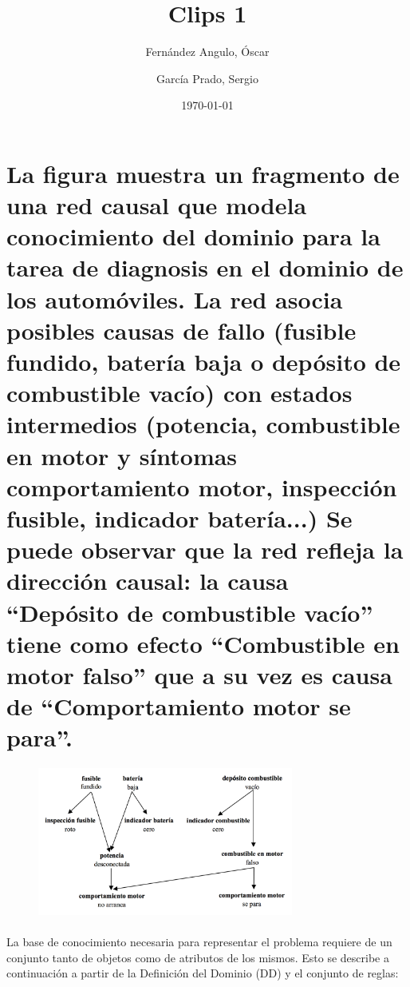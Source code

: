 \documentclass[10pt, a4paper,spanish]{article}
\title{\vspace{-15mm}\fontsize{24pt}{10pt}\selectfont\textbf{Clips 1}} %
\author{
	Fernández Angulo, Óscar \\
	\and
	García Prado, Sergio
}
\date{\today}
\begin{document}
	\maketitle %

	\thispagestyle{fancy} %





    \section{La figura muestra un fragmento de una red causal que modela conocimiento del dominio para la tarea de diagnosis en el dominio de los automóviles. La red asocia posibles causas de fallo (fusible fundido, batería baja o depósito de combustible vacío) con estados intermedios (potencia, combustible en motor y síntomas comportamiento motor, inspección fusible, indicador batería...) Se puede observar que la red refleja la dirección causal: la causa ``Depósito de combustible vacío'' tiene como efecto ``Combustible en motor falso'' que a su vez es causa de ``Comportamiento motor se para''.}

		\begin{figure}[H]
			\begin{center}
				\includegraphics[width=0.75\textwidth]{exercise-3-network}
			\end{center}
		\end{figure}

		\paragraph{}
		La base de conocimiento necesaria para representar el problema requiere de un conjunto tanto de objetos como de atributos de los mismos. Esto se describe a continuación a partir de la Definición del Dominio (DD) y el conjunto de reglas:
\end{document}
